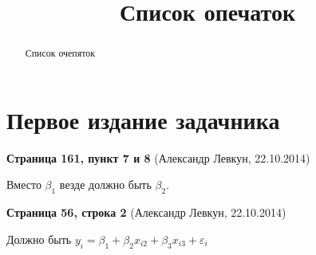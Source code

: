 \documentclass{article}
\title{Список опечаток}
\newcommand{\erroronpage}[4]{\textbf{Страница #1, #2} (#3, #4)}
\begin{document}
\maketitle
\begin{abstract} Список очепяток
\end{abstract}

\section{Первое издание задачника}

\erroronpage{161}{пункт 7 и 8}{Александр Левкун}{22.10.2014}

Вместо $\beta_1$ везде должно быть $\beta_2$.

\erroronpage{56}{строка 2}{Александр Левкун}{22.10.2014}

Должно быть $y_i=\beta_1+\beta_2 x_{i2} + \beta_3 x_{i3}+\varepsilon_i$
\end{document}
